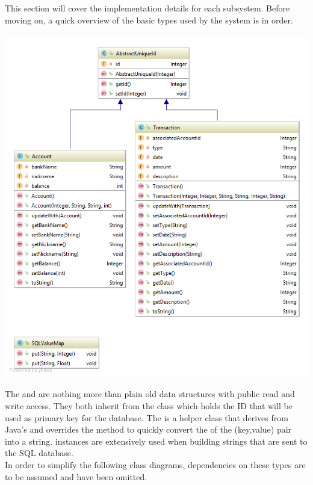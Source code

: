\documentclass[12pt]{article}
\begin{document}
This section will cover the implementation details for each subsystem. Before moving on, a quick overview of the basic types used by the system is in order.\\
\\
\includegraphics[width=\textwidth,height=\textheight,keepaspectratio]{Diagrams/UML/Types.png}
\bigskip

\newpage
The  and  are nothing more than plain old data structures with public read and write access. They both inherit from the  class which holds the ID that will be used as primary key for the database. The  is a helper class  that derives from Java's  and overrides the  method to quickly convert the  of the (key,value) pair into a string.  instances are extensively used when building strings that are sent to the SQL database.\\

In order to simplify the following class diagrams, dependencies on these types are to be assumed and have been omitted.\\
\end{document}
